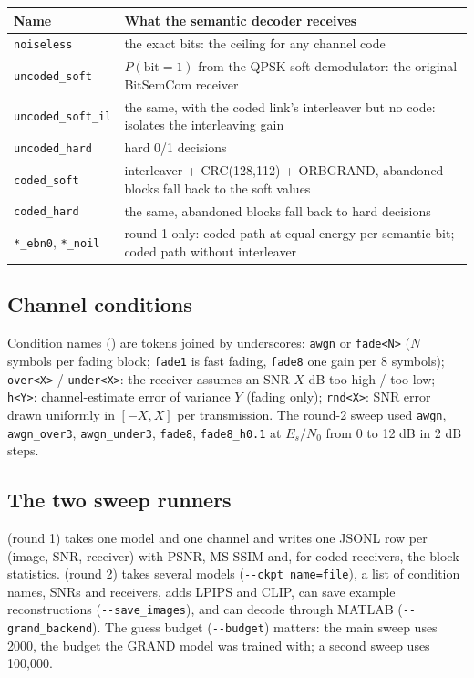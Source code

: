 \documentclass{article}
\begin{document}
\begin{center}
\begin{tabular}{p{} p{}}
\toprule
Name & What the semantic decoder receives \\
\midrule
\texttt{noiseless} & the exact bits: the ceiling for any channel code \\
\texttt{uncoded\_soft} & $P(\text{bit}=1)$ from the QPSK soft demodulator: the original BitSemCom receiver \\
\texttt{uncoded\_soft\_il} & the same, with the coded link's interleaver but no code: isolates the interleaving gain \\
\texttt{uncoded\_hard} & hard 0/1 decisions \\
\texttt{coded\_soft} & interleaver + CRC(128,112) + ORBGRAND, abandoned blocks fall back to the soft values \\
\texttt{coded\_hard} & the same, abandoned blocks fall back to hard decisions \\
\texttt{*\_ebn0}, \texttt{*\_noil} & round 1 only: coded path at equal energy per semantic bit; coded path without interleaver \\
\bottomrule
\end{tabular}
\end{center}

\subsection{Channel conditions}
\label{sec:conditions}

Condition names () are tokens joined by underscores:
\texttt{awgn} or \texttt{fade<N>} ($N$ symbols per fading block; \texttt{fade1} is fast fading,
\texttt{fade8} one gain per 8 symbols); \texttt{over<X>} / \texttt{under<X>}: the receiver assumes an SNR
$X$ dB too high / too low; \texttt{h<Y>}: channel-estimate error of variance $Y$ (fading only);
\texttt{rnd<X>}: SNR error drawn uniformly in $[-X, X]$ per transmission. The round-2 sweep used
\texttt{awgn}, \texttt{awgn\_over3}, \texttt{awgn\_under3}, \texttt{fade8}, \texttt{fade8\_h0.1} at
$E_s/N_0$ from 0 to 12 dB in 2 dB steps.

\subsection{The two sweep runners}

 (round 1) takes one model and one channel and writes one JSONL row per
(image, SNR, receiver) with PSNR, MS-SSIM and, for coded receivers, the block statistics.
 (round 2) takes several models (\texttt{-{}-ckpt name=file}), a list of
condition names, SNRs and receivers, adds LPIPS and CLIP, can save example reconstructions
(\texttt{-{}-save\_images}), and can decode through MATLAB (\texttt{-{}-grand\_backend}). The guess budget
(\texttt{-{}-budget}) matters: the main sweep uses 2000, the budget the GRAND model was trained with; a
second sweep uses 100{,}000.
\end{document}
